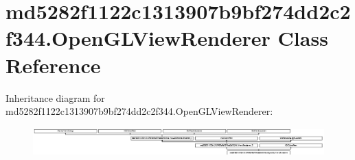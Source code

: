 \hypertarget{classmd5282f1122c1313907b9bf274dd2c2f344_1_1OpenGLViewRenderer}{}\section{md5282f1122c1313907b9bf274dd2c2f344.\+Open\+G\+L\+View\+Renderer Class Reference}
\label{classmd5282f1122c1313907b9bf274dd2c2f344_1_1OpenGLViewRenderer}
Inheritance diagram for md5282f1122c1313907b9bf274dd2c2f344.\+Open\+G\+L\+View\+Renderer\+:\begin{figure}[H]
\begin{center}
\leavevmode
\includegraphics[height=1.098039cm]{classmd5282f1122c1313907b9bf274dd2c2f344_1_1OpenGLViewRenderer}
\end{center}
\end{figure}
